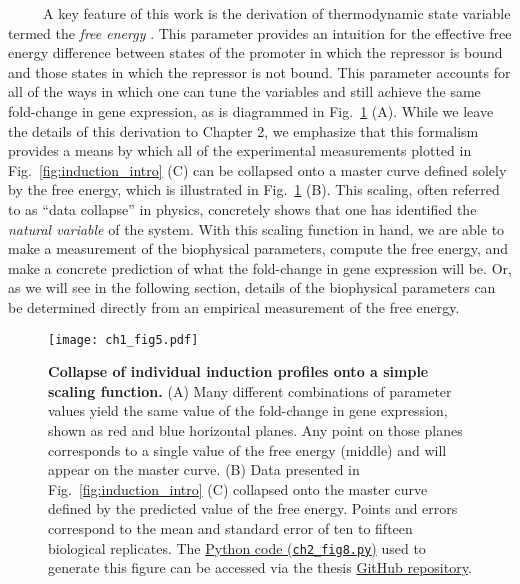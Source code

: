 \documentclass[12pt]{caltech_thesis}
\begin{document}
~~~~~A key feature of this work is the derivation of thermodynamic state
variable termed the \emph{free energy} \autocite{keymer2006,swem2008}.
This parameter provides an intuition for the effective free energy
difference between states of the promoter in which the repressor is
bound and those states in which the repressor is not bound. This
parameter accounts for all of the ways in which one can tune the
variables and still achieve the same fold-change in gene expression, as
is diagrammed in Fig.~\ref{fig:collapse_intro} (A). While we leave the
details of this derivation to Chapter 2, we emphasize that this
formalism provides a means by which all of the experimental measurements
plotted in Fig.~\ref{fig:induction_intro} (C) can be collapsed onto a
master curve defined solely by the free energy, which is illustrated in
Fig.~\ref{fig:collapse_intro} (B). This scaling, often referred to as
``data collapse'' in physics, concretely shows that one has identified
the \emph{natural variable} of the system. With this scaling function in
hand, we are able to make a measurement of the biophysical parameters,
compute the free energy, and make a concrete prediction of what the
fold-change in gene expression will be. Or, as we will see in the
following section, details of the biophysical parameters can be
determined directly from an empirical measurement of the free energy.

\hypertarget{fig:collapse_intro}{%
\begin{figure}
\centering
\texttt{[image: ch1\_fig5.pdf]}
\caption[{Collapse of individual induction profiles onto a simple
scaling function.}]{\textbf{Collapse of individual induction profiles
onto a simple scaling function.} (A) Many different combinations of
parameter values yield the same value of the fold-change in gene
expression, shown as red and blue horizontal planes. Any point on those
planes corresponds to a single value of the free energy (middle) and
will appear on the master curve. (B) Data presented in
Fig.~\ref{fig:induction_intro} (C) collapsed onto the master curve
defined by the predicted value of the free energy. Points and errors
correspond to the mean and standard error of ten to fifteen biological
replicates. The
\href{https://github.com/gchure/phd/blob/master/src/chapter_02/code/ch2_fig8.py}{Python
code (\texttt{ch2\_fig8.py})} used to generate this figure can be
accessed via the thesis \href{https://github.com/gchure/phd}{GitHub
repository}.}
\label{fig:collapse_intro}
\end{figure}
}
\end{document}
